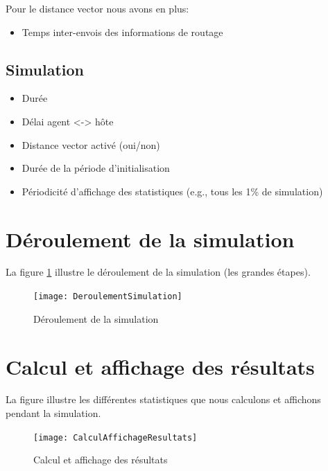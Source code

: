 \documentclass[a4paper,11pt]{article}
\begin{document}
Pour le distance vector nous avons en plus:
\begin{itemize}
 \item Temps inter-envois des informations de routage
\end{itemize}

\subsection{Simulation}
\begin{itemize}
 \item Durée
 \item Délai agent <-> hôte
 \item Distance vector activé (oui/non)
 \item Durée de la période d'initialisation
 \item Périodicité d'affichage des statistiques (e.g., tous les 1\% de simulation)
\end{itemize}









\section{Déroulement de la simulation}
La figure \ref{fig:deroulement-simulation} illustre le déroulement de la simulation (les grandes étapes).

\begin{figure}[h!t]
  \centering
    \texttt{[image: DeroulementSimulation]}
  \caption{Déroulement de la simulation}
  \label{fig:deroulement-simulation}
\end{figure}







\section{Calcul et affichage des résultats}
La figure  illustre les différentes statistiques que nous calculons et affichons pendant la simulation.

\begin{figure}[h!t]
  \centering
    \texttt{[image: CalculAffichageResultats]}
  \caption{Calcul et affichage des résultats}
  \label{fig:calcul-affichage-resultats}
\end{figure}
\end{document}

